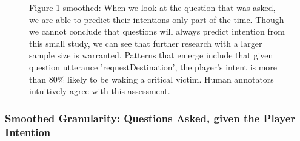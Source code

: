 
\begin{figure}[h!]
    \centering
    \caption{Figure 1 smoothed: When we look at the question that was asked, we are able to predict their intentions only part of the time. Though we cannot conclude that questions will always predict intention from this small study, we can see that further research with a larger sample size is warranted. Patterns that emerge include that given question utterance 'requestDestination', the player's intent is more than 80\% likely to be waking a critical victim. Human annotators intuitively agree with this assessment.}
\end{figure}








\newpage

\subsubsection{Smoothed Granularity: Questions Asked, given the Player Intention}

